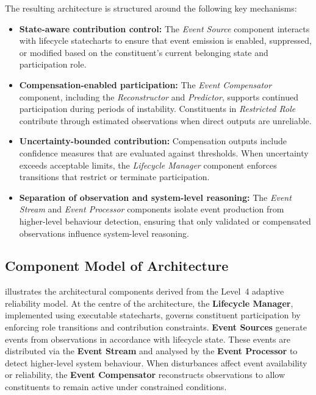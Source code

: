 The resulting architecture is structured around the following key mechanisms:

\begin{itemize}
    \item \textbf{State-aware contribution control:} The \textit{Event Source} component interacts with lifecycle statecharts to ensure that event emission is enabled, suppressed, or modified based on the constituent's current belonging state and participation role.
    
    \item \textbf{Compensation-enabled participation:} The \textit{Event Compensator} component, including the \textit{Reconstructor} and \textit{Predictor}, supports continued participation during periods of instability. Constituents in \textit{Restricted Role} contribute through estimated observations when direct outputs are unreliable.

    \item \textbf{Uncertainty-bounded contribution:} Compensation outputs include confidence measures that are evaluated against thresholds. When uncertainty exceeds acceptable limits, the \textit{Lifecycle Manager} component enforces transitions that restrict or terminate participation.

    \item \textbf{Separation of observation and system-level reasoning:} The \textit{Event Stream} and \textit{Event Processor} components isolate event production from higher-level behaviour detection, ensuring that only validated or compensated observations influence system-level reasoning.
\end{itemize}

\subsection{Component Model of Architecture}

 illustrates the architectural components derived from the Level~4 adaptive reliability model. At the centre of the architecture, the \textbf{Lifecycle Manager}, implemented using executable statecharts, governs constituent participation by enforcing role transitions and contribution constraints. \textbf{Event Sources} generate events from observations in accordance with lifecycle state. These events are distributed via the \textbf{Event Stream} and analysed by the \textbf{Event Processor} to detect higher-level system behaviour. When disturbances affect event availability or reliability, the \textbf{Event Compensator} reconstructs observations to allow constituents to remain active under constrained conditions.

